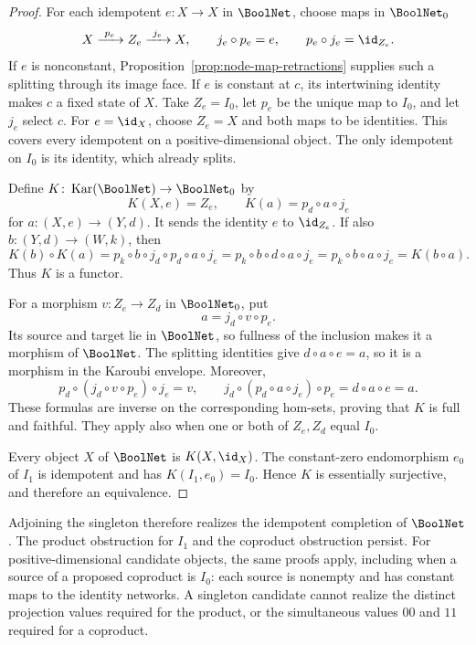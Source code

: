 \begin{proof}
For each idempotent $e\colon X\to X$ in $\BoolNet$, choose maps in $\BoolNet_0$
\[
    X\xrightarrow{\ p_e\ }Z_e\xrightarrow{\ j_e\ }X,
    \qquad j_e\circ p_e=e,\qquad p_e\circ j_e=\id_{Z_e}.
\]
If $e$ is nonconstant, Proposition~\ref{prop:node-map-retractions} supplies such a splitting through its image face. If $e$ is constant at $c$, its intertwining identity makes $c$ a fixed state of $X$. Take $Z_e=I_0$, let $p_e$ be the unique map to $I_0$, and let $j_e$ select $c$. For $e=\id_X$, choose $Z_e=X$ and both maps to be identities. This covers every idempotent on a positive-dimensional object. The only idempotent on $I_0$ is its identity, which already splits.

Define $K\colon\operatorname{Kar}(\BoolNet)\to\BoolNet_0$ by
\[
    K(X,e)=Z_e,\qquad K(a)=p_d\circ a\circ j_e
\]
for $a\colon(X,e)\to(Y,d)$. It sends the identity $e$ to $\id_{Z_e}$. If also $b\colon(Y,d)\to(W,k)$, then
\[
    K(b)\circ K(a)
    =p_k\circ b\circ j_d\circ p_d\circ a\circ j_e
    =p_k\circ b\circ d\circ a\circ j_e
    =p_k\circ b\circ a\circ j_e
    =K(b\circ a).
\]
Thus $K$ is a functor.

For a morphism $v\colon Z_e\to Z_d$ in $\BoolNet_0$, put
\[
    a=j_d\circ v\circ p_e.
\]
Its source and target lie in $\BoolNet$, so fullness of the inclusion makes it a morphism of $\BoolNet$. The splitting identities give $d\circ a\circ e=a$, so it is a morphism in the Karoubi envelope. Moreover,
\[
    p_d\circ(j_d\circ v\circ p_e)\circ j_e=v,
    \qquad
    j_d\circ(p_d\circ a\circ j_e)\circ p_e
    =d\circ a\circ e=a.
\]
These formulas are inverse on the corresponding hom-sets, proving that $K$ is full and faithful. They apply also when one or both of $Z_e,Z_d$ equal $I_0$.

Every object $X$ of $\BoolNet$ is $K(X,\id_X)$. The constant-zero endomorphism $e_0$ of $I_1$ is idempotent and has $K(I_1,e_0)=I_0$. Hence $K$ is essentially surjective, and therefore an equivalence.
\end{proof}

Adjoining the singleton therefore realizes the idempotent completion of $\BoolNet$. The product obstruction for $I_1$ and the coproduct obstruction persist. For positive-dimensional candidate objects, the same proofs apply, including when a source of a proposed coproduct is $I_0$: each source is nonempty and has constant maps to the identity networks. A singleton candidate cannot realize the distinct projection values required for the product, or the simultaneous values $00$ and $11$ required for a coproduct.

